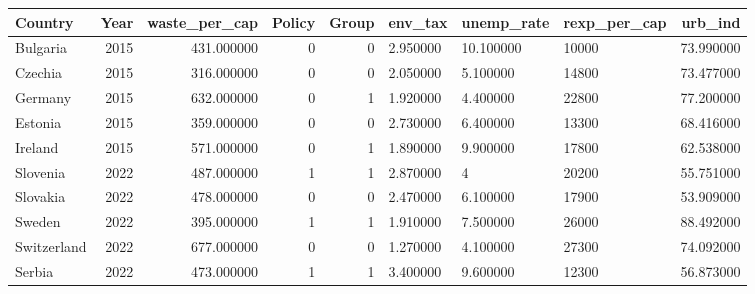 \begin{tabular}{lrrrrlllr}
\toprule
Country & Year & waste_per_cap & Policy & Group & env_tax & unemp_rate & rexp_per_cap & urb_ind \\
\midrule
Bulgaria & 2015 & 431.000000 & 0 & 0 & 2.950000 & 10.100000 & 10000 & 73.990000 \\
Czechia & 2015 & 316.000000 & 0 & 0 & 2.050000 & 5.100000 & 14800 & 73.477000 \\
Germany & 2015 & 632.000000 & 0 & 1 & 1.920000 & 4.400000 & 22800 & 77.200000 \\
Estonia & 2015 & 359.000000 & 0 & 0 & 2.730000 & 6.400000 & 13300 & 68.416000 \\
Ireland & 2015 & 571.000000 & 0 & 1 & 1.890000 & 9.900000 & 17800 & 62.538000 \\
Slovenia & 2022 & 487.000000 & 1 & 1 & 2.870000 & 4 & 20200 & 55.751000 \\
Slovakia & 2022 & 478.000000 & 0 & 0 & 2.470000 & 6.100000 & 17900 & 53.909000 \\
Sweden & 2022 & 395.000000 & 1 & 1 & 1.910000 & 7.500000 & 26000 & 88.492000 \\
Switzerland & 2022 & 677.000000 & 0 & 0 & 1.270000 & 4.100000 & 27300 & 74.092000 \\
Serbia & 2022 & 473.000000 & 1 & 1 & 3.400000 & 9.600000 & 12300 & 56.873000 \\
\bottomrule
\end{tabular}
